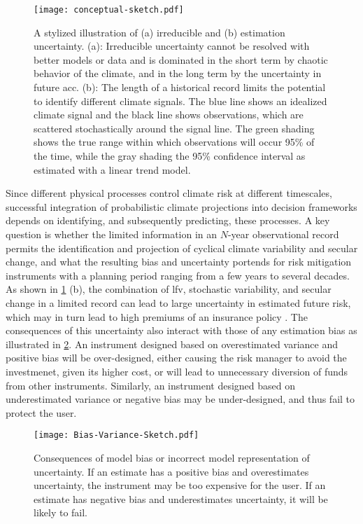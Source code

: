 \documentclass[
]{agujournal2018}
\begin{document}
\begin{figure}
  \centering
  \texttt{[image: conceptual-sketch.pdf]}
  \caption{
    A stylized illustration of (a) irreducible and (b) estimation uncertainty.
    (a): Irreducible uncertainty cannot be resolved with better models or data and is dominated in the short term by chaotic behavior of the climate, and in the long term by the uncertainty in future \acrlong{acc}.
    (b): The length of a historical record limits the potential to identify different climate signals.
    The blue line shows an idealized climate signal and the black line shows observations, which are scattered stochastically around the signal line.
    The green shading shows the true range within which observations will occur 95\% of the time, while the gray shading the 95\% confidence interval as estimated with a linear trend model.
    }\label{fig:conceptual-sketch}
\end{figure}

Since different physical processes control climate risk at different timescales, successful integration of probabilistic climate projections into decision frameworks depends on identifying, and subsequently predicting, these processes.
A key question is whether the limited information in an $N$-year observational record permits the identification and projection of cyclical climate variability and secular change, and what the resulting bias and uncertainty portends for risk mitigation instruments with a planning period ranging from a few years to several decades.
As shown in \cref{fig:conceptual-sketch} (b), the combination of \gls{lfv}, stochastic variability, and secular change in a limited record can lead to large uncertainty in estimated future risk, which may in turn lead to high premiums of an insurance policy \citep{Kunreuther:1996kp}.
The consequences of this uncertainty also interact with those of any estimation bias as illustrated in \cref{fig:conceptual-bias-variance}.
An instrument designed based on overestimated variance and positive bias will be over-designed, either causing the risk manager to avoid the investmenet, given its higher cost, or will lead to unnecessary diversion of funds from other instruments.
Similarly, an instrument designed based on underestimated variance or negative bias may be under-designed, and thus fail to protect the user.
\begin{figure}
  \centering
  \texttt{[image: Bias-Variance-Sketch.pdf]}
  \caption{
    Consequences of model bias or incorrect model representation of uncertainty.
    If an estimate has a positive bias and overestimates uncertainty, the instrument may be too expensive for the user.
    If an estimate has negative bias and underestimates uncertainty, it will be likely to fail.
  }\label{fig:conceptual-bias-variance}
\end{figure}
\end{document}
